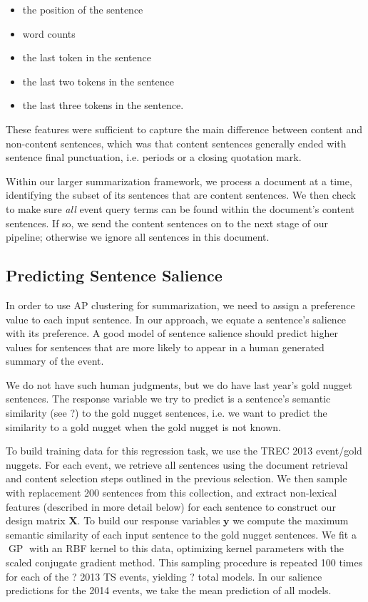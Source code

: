 \documentclass{sig-alternate}
\begin{document}
\begin{itemize}
 \item the position of the sentence
 \item word counts
 \item the last token in the sentence
 \item the last two tokens in the sentence
 \item the last three tokens in the sentence.
\end{itemize} 

These features were sufficient to capture 
the main difference between content and non-content sentences,
which 
was that content sentences generally ended with sentence final punctuation, 
i.e. periods or a closing quotation mark. 

Within our larger summarization framework, we process a document at a time,
identifying the subset of its sentences that are content sentences.
We then check to make sure \emph{all} event
query terms can be found within the document's content sentences. If so,
we send the content sentences on to the next stage of our pipeline; otherwise
we ignore all sentences in this document.

\subsection{Predicting Sentence Salience}\label{subsec:Predict}

In order to use AP clustering for summarization, we need to assign a
preference value to each input sentence.  In our approach, we equate a
sentence's salience with its preference.  A good model of sentence salience
should predict higher values for sentences that are more likely to appear in a
human generated summary of the event. 

We do not have such human judgments, but we do have last year's gold nugget
sentences.
The response variable we try to predict is a sentence's semantic similarity
(see ?) to the gold nugget sentences, i.e. we want to predict the similarity
to a gold nugget when the gold nugget is not known.


To build training data for this regression task, 
we use the TREC 2013 event/gold nuggets. For each event, we retrieve all 
sentences using the document retrieval and content selection steps outlined
in the previous selection. We then sample with replacement 200 sentences
from this collection, and extract non-lexical features (described in more 
detail below) for each sentence
to construct our design matrix $\mathbf{X}$. To build our response variables
$\mathbf{y}$ we compute the maximum semantic similarity of each input
sentence to the gold nugget sentences. We fit a $\operatorname{GP}$ with
an RBF kernel to this data, optimizing kernel parameters with the scaled 
conjugate gradient method. This sampling procedure is repeated 100 times
for each of the ? 2013 TS events, yielding ? total models. In our salience 
predictions for the 2014 events, we take the mean prediction of all models.
\end{document}
